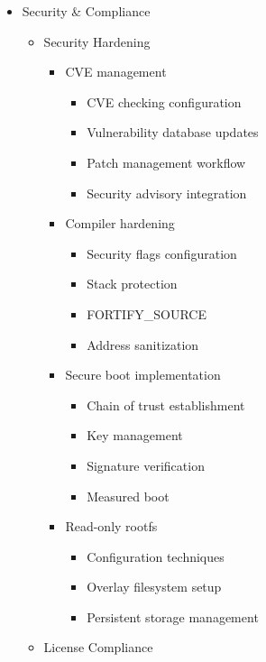 \documentclass[
]{article}
\providecommand{\tightlist}{%
  \setlength{\itemsep}{0pt}\setlength{\parskip}{0pt}}
\begin{document}
\begin{itemize}
\tightlist
\item
  Security \& Compliance

  \begin{itemize}
  \tightlist
  \item
    Security Hardening

    \begin{itemize}
    \tightlist
    \item
      CVE management

      \begin{itemize}
      \tightlist
      \item
        CVE checking configuration
      \item
        Vulnerability database updates
      \item
        Patch management workflow
      \item
        Security advisory integration
      \end{itemize}
    \item
      Compiler hardening

      \begin{itemize}
      \tightlist
      \item
        Security flags configuration
      \item
        Stack protection
      \item
        FORTIFY\_SOURCE
      \item
        Address sanitization
      \end{itemize}
    \item
      Secure boot implementation

      \begin{itemize}
      \tightlist
      \item
        Chain of trust establishment
      \item
        Key management
      \item
        Signature verification
      \item
        Measured boot
      \end{itemize}
    \item
      Read-only rootfs

      \begin{itemize}
      \tightlist
      \item
        Configuration techniques
      \item
        Overlay filesystem setup
      \item
        Persistent storage management
      \end{itemize}
    \end{itemize}
  \item
    License Compliance


\end{itemize}
\end{itemize}
\end{document}

